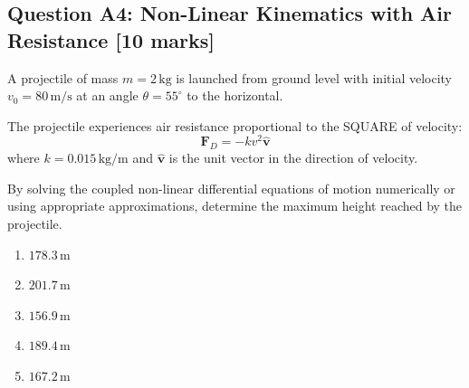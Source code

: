 \documentclass[12pt,a4paper]{article}
\begin{document}
\begin{questionbox}
\subsection*{Question A4: Non-Linear Kinematics with Air Resistance [10 marks]}

A projectile of mass $m = 2\,\text{kg}$ is launched from ground level with initial velocity 
$v_0 = 80\,\text{m/s}$ at an angle $\theta = 55^\circ$ to the horizontal. 

The projectile experiences air resistance proportional to the SQUARE of velocity:
$$\mathbf{F}_D = -k v^2 \hat{\mathbf{v}}$$
where $k = 0.015\,\text{kg/m}$ and $\hat{\mathbf{v}}$ is the unit vector in the direction of velocity.

\begin{center}
\end{center}

By solving the coupled non-linear differential equations of motion numerically or using 
appropriate approximations, determine the maximum height reached by the projectile.

\begin{mcqbox}
\begin{enumerate}[label=(\Alph*),leftmargin=*]
    \item $178.3\,\text{m}$
    \item $201.7\,\text{m}$
    \item $156.9\,\text{m}$
    \item $189.4\,\text{m}$
    \item $167.2\,\text{m}$
\end{enumerate}
\end{mcqbox}
\end{questionbox}
\end{document}
